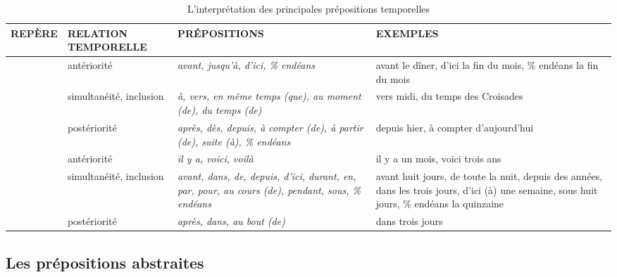 \documentclass[UTF8]{report}
\begin{document}
\begin{table}[H]
    \centering
    \small
    \begin{tabularx}{\textwidth}{|>{\raggedright\arraybackslash}p{2.5cm}|>{\raggedright\arraybackslash}p{2.8cm}|>{\raggedright\arraybackslash}X|>{\raggedright\arraybackslash}X|}
    \hline
    \rowcolor{cyan!20}
    \textbf{REPÈRE} & \textbf{RELATION TEMPORELLE} & \textbf{PRÉPOSITIONS} & \textbf{EXEMPLES} \\
    \hline
    \multirow{3}{*}{\textbf{date}} 
    & antériorité & \textit{avant, jusqu’à, d’ici, \% endéans} & avant le dîner, d’ici la fin du mois, \% endéans la fin du mois \\
    & simultanéité, inclusion & \textit{à, vers, en même temps (que), au moment (de), du temps (de)} & vers midi, du temps des Croisades \\
    & postériorité & \textit{après, dès, depuis, à compter (de), à partir (de), suite (à), \% endéans} & depuis hier, à compter d’aujourd’hui \\
    \hline
    \multirow{3}{*}{\textbf{durée}} 
    & antériorité & \textit{il y a, voici, voilà} & il y a un mois, voici trois ans \\
    & simultanéité, inclusion & \textit{avant, dans, de, depuis, d’ici, durant, en, par, pour, au cours (de), pendant, sous, \% endéans} & avant huit jours, de toute la nuit, depuis des années, dans les trois jours, d’ici (à) une semaine, sous huit jours, \% endéans la quinzaine \\
    & postériorité & \textit{après, dans, au bout (de)} & dans trois jours \\
    \hline
    \end{tabularx}
    \caption{L’interprétation des principales prépositions temporelles}
\end{table}

\clearpage
\subsection{Les prépositions abstraites}
\end{document}
